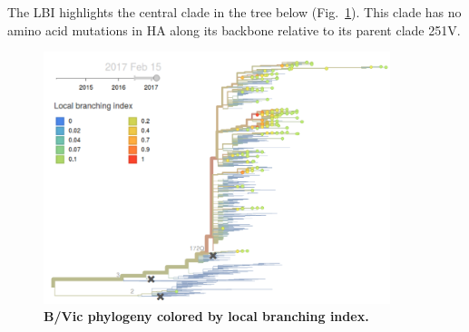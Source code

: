 \documentclass[11pt,oneside,letterpaper]{article}
\begin{document}
\pagebreak

The LBI highlights the central clade in the tree below (Fig.\ \ref{Yam_lbi}). This clade has no amino acid mutations in HA along its backbone relative to its parent clade 251V.

\begin{figure}[H]
	\centering
	\includegraphics[width=0.9\textwidth]{../figures/feb-2017/Yam_lbi.png}
	\caption{\textbf{B/Vic phylogeny colored by local branching index.}
	}
	\label{Yam_lbi}
\end{figure}

\clearpage
\pagebreak



\end{document}
